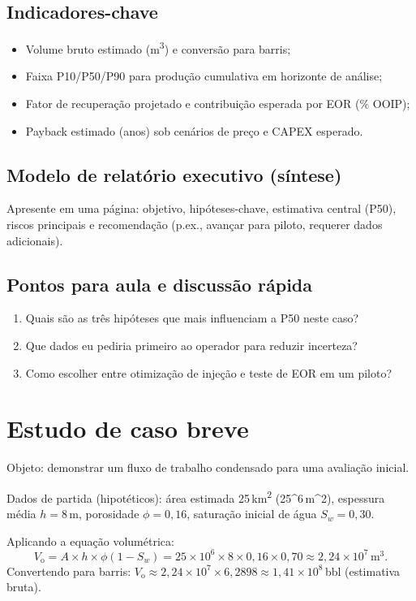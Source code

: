 \documentclass[
  12pt,
  a4paper,
  oneside,
  brazilian,
  sumario=tradicional
]{abntex2}
\begin{document}
\section{Indicadores-chave}
\begin{itemize}
  \item Volume bruto estimado (m\textsuperscript{3}) e conversão para barris;
  \item Faixa P10/P50/P90 para produção cumulativa em horizonte de análise;
  \item Fator de recuperação projetado e contribuição esperada por EOR (\% OOIP);
  \item Payback estimado (anos) sob cenários de preço e CAPEX esperado.
\end{itemize}

\section{Modelo de relatório executivo (síntese)}
Apresente em uma página: objetivo, hipóteses-chave, estimativa central (P50), riscos principais e recomendação (p.ex., avançar para piloto, requerer dados adicionais).

\section{Pontos para aula e discussão rápida}
\begin{enumerate}
  \item Quais são as três hipóteses que mais influenciam a P50 neste caso?
  \item Que dados eu pediria primeiro ao operador para reduzir incerteza?
  \item Como escolher entre otimização de injeção e teste de EOR em um piloto?
\end{enumerate}

\chapter{Estudo de caso breve}
Objeto: demonstrar um fluxo de trabalho condensado para uma avaliação inicial.

Dados de partida (hipotéticos): área estimada 25\,km\textsuperscript{2} (25^{6}\,m^{2}), espessura média $h=8\,$m, porosidade $\phi=0{,}16$, saturação inicial de água $S_{w}=0{,}30$.

Aplicando a equação volumétrica:
\[V_{\mathrm{o}} = A\times h\times \phi(1-S_{w}) = 25\times10^{6}\times8\times0{,}16\times0{,}70 \approx 2{,}24\times10^{7}\,\mathrm{m}^{3} .\]
Convertendo para barris: $V_{\mathrm{o}}\approx2{,}24\times10^{7}\times6{,}2898\approx1{,}41\times10^{8}\,$bbl (estimativa bruta).
\end{document}

